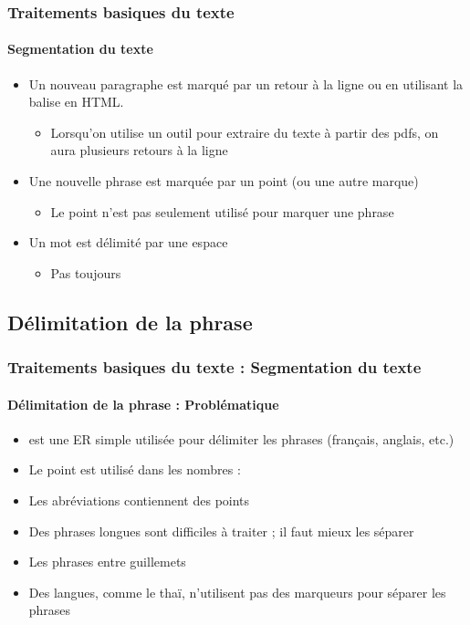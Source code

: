 \documentclass[xcolor=table]{beamer}
\begin{document}
\begin{frame}
\frametitle{Traitements basiques du texte}
\framesubtitle{Segmentation du texte}

\begin{itemize}
	\item Un nouveau paragraphe est marqué par un retour à la ligne ou en utilisant la balise  en HTML.
	\begin{itemize}
		\item Lorsqu'on utilise un outil pour extraire du texte à partir des pdfs, on aura plusieurs retours à la ligne 
	\end{itemize}
	\item Une nouvelle phrase est marquée par un point (ou une autre marque)
	\begin{itemize}
		\item Le point n'est pas seulement utilisé pour marquer une phrase
	\end{itemize}
	\item Un mot est délimité par une espace 
	\begin{itemize}
		\item Pas toujours 
	\end{itemize}
\end{itemize}

\end{frame}

\subsection{Délimitation de la phrase}

\begin{frame}
\frametitle{Traitements basiques du texte : Segmentation du texte}
\framesubtitle{Délimitation de la phrase : Problématique} 

\begin{itemize}
	\item \expword{/[.?!]/} est une ER simple utilisée pour délimiter les phrases (français, anglais, etc.)
	\item Le point est utilisé dans les nombres : 
	\item Les abréviations contiennent des points
	\item Des phrases longues sont difficiles à traiter ; il faut mieux les séparer 
	\item Les phrases entre guillemets
	\item Des langues, comme le thaï, n'utilisent pas des marqueurs pour séparer les phrases  
\end{itemize}

\end{frame}
\end{document}
